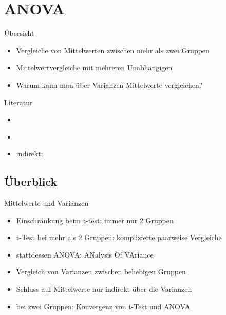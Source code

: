\section{ANOVA}

\begin{frame}
  {Übersicht}
  \begin{itemize}[<+->]
    \item Vergleiche von Mittelwerten zwischen mehr als zwei Gruppen
    \item Mittelwertvergleiche mit mehreren Unabhängigen
    \item \alert{Warum kann man über Varianzen Mittelwerte vergleichen?}
  \end{itemize}
\end{frame}

\begin{frame}
  {Literatur}
  \begin{itemize}
    \item \citet{GravetterWallnau2007}
    \item \citet{Bortz2010}
    \item indirekt: \citet{MaxwellDelaney2004}
  \end{itemize}
\end{frame}

\subsection{Überblick}

\begin{frame}
  {Mittelwerte und Varianzen}
  \begin{itemize}[<+->]
    \item Einschränkung beim t-test: immer nur 2 Gruppen
    \item t-Test bei mehr als 2 Gruppen: komplizierte paarweise Vergleiche
      \Zeile
    \item stattdessen ANOVA: ANalysis Of VAriance
    \item Vergleich von Varianzen zwischen beliebigen Gruppen
    \item Schluss auf Mittelwerte nur indirekt über die Varianzen
      \Zeile
    \item \alert{bei zwei Gruppen: Konvergenz von t-Test und ANOVA}
  \end{itemize}
\end{frame}

